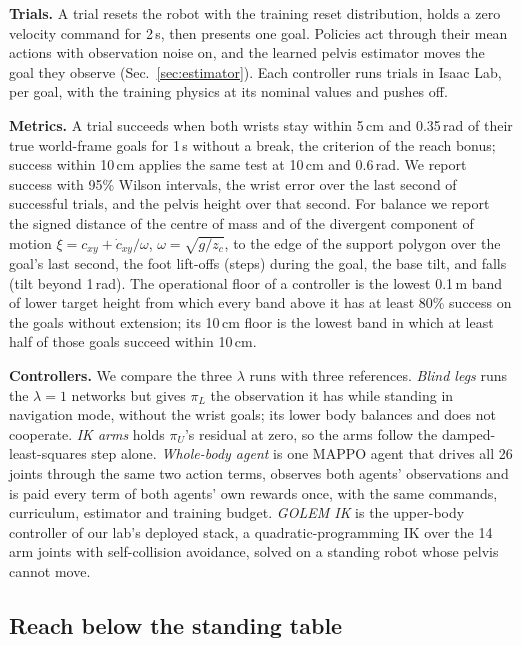 \textbf{Trials.} A trial resets the robot with the training reset distribution, holds a zero velocity command for
2\,s, then presents one goal. Policies act through their mean actions with observation noise on, and the learned
pelvis estimator moves the goal they observe (Sec.~\ref{sec:estimator}). Each controller runs
 trials in Isaac Lab,  per goal, with the training physics at its
nominal values and pushes off.

\textbf{Metrics.} A trial succeeds when both wrists stay within 5\,cm and 0.35\,rad of their true world-frame goals
for 1\,s without a break, the criterion of the reach bonus; success within 10\,cm applies the same test at 10\,cm
and 0.6\,rad. We report success with 95\% Wilson intervals, the wrist
error over the last second of successful trials, and the pelvis height over that second. For balance we report the
signed distance of the centre of mass and of the divergent component of motion
$\xi = c_{xy} + \dot c_{xy}/\omega$, $\omega = \sqrt{g/z_c}$, to the edge of the support polygon over the goal's
last second, the foot lift-offs (steps) during the goal, the base tilt, and falls (tilt beyond 1\,rad). The
operational floor of a controller is the lowest 0.1\,m band of lower target height from which every band above it
has at least 80\% success on the goals without extension; its 10\,cm floor is the lowest band in which at least half
of those goals succeed within 10\,cm.

\textbf{Controllers.} We compare the three $\lambda$ runs with three references. \emph{Blind legs} runs the
$\lambda = 1$ networks but gives $\pi_L$ the observation it has while standing in navigation mode, without the
wrist goals; its lower body balances and does not cooperate. \emph{IK arms} holds $\pi_U$'s residual at zero, so the
arms follow the damped-least-squares step alone. \emph{Whole-body agent} is one MAPPO agent that drives all 26 joints
through the same two action terms, observes both agents' observations and is paid every term of both agents' own
rewards once, with the same commands, curriculum, estimator and training budget. \emph{GOLEM IK} is the upper-body
controller of our lab's deployed
stack, a quadratic-programming IK over the 14 arm joints with self-collision avoidance, solved on a standing robot
whose pelvis cannot move.

\subsection{Reach below the standing table}
\label{sec:reach}

